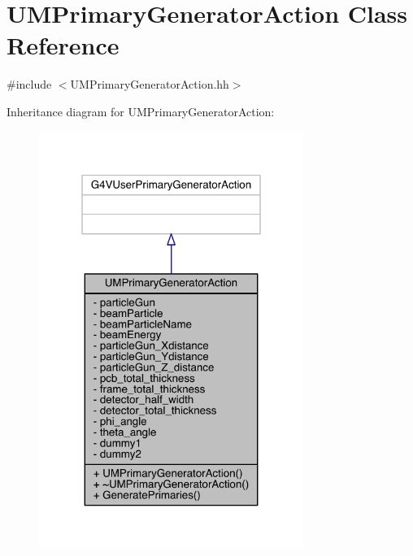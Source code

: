 \hypertarget{classUMPrimaryGeneratorAction}{}\section{U\+M\+Primary\+Generator\+Action Class Reference}
\label{classUMPrimaryGeneratorAction}


{\ttfamily \#include $<$U\+M\+Primary\+Generator\+Action.\+hh$>$}



Inheritance diagram for U\+M\+Primary\+Generator\+Action\+:
\nopagebreak
\begin{figure}[H]
\begin{center}
\leavevmode
\includegraphics[width=244pt]{classUMPrimaryGeneratorAction__inherit__graph}
\end{center}
\end{figure}


